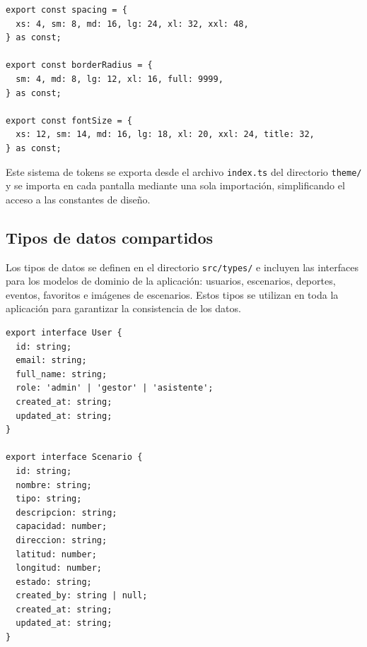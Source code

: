 \begin{lstlisting}
export const spacing = {
  xs: 4, sm: 8, md: 16, lg: 24, xl: 32, xxl: 48,
} as const;

export const borderRadius = {
  sm: 4, md: 8, lg: 12, xl: 16, full: 9999,
} as const;

export const fontSize = {
  xs: 12, sm: 14, md: 16, lg: 18, xl: 20, xxl: 24, title: 32,
} as const;
\end{lstlisting}

Este sistema de tokens se exporta desde el archivo \texttt{index.ts} del
directorio \texttt{theme/} y se importa en cada pantalla mediante una sola
importaci\'on, simplificando el acceso a las constantes de dise\~no.

\subsection{Tipos de datos compartidos}

Los tipos de datos se definen en el directorio \texttt{src/types/} e incluyen
las interfaces para los modelos de dominio de la aplicaci\'on: usuarios,
escenarios, deportes, eventos, favoritos e im\'agenes de escenarios. Estos
tipos se utilizan en toda la aplicaci\'on para garantizar la consistencia de
los datos.

\begin{lstlisting}
export interface User {
  id: string;
  email: string;
  full_name: string;
  role: 'admin' | 'gestor' | 'asistente';
  created_at: string;
  updated_at: string;
}

export interface Scenario {
  id: string;
  nombre: string;
  tipo: string;
  descripcion: string;
  capacidad: number;
  direccion: string;
  latitud: number;
  longitud: number;
  estado: string;
  created_by: string | null;
  created_at: string;
  updated_at: string;
}
\end{lstlisting}

